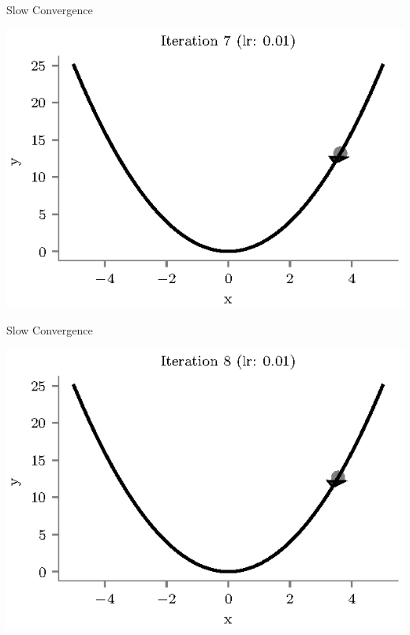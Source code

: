 \documentclass{beamer}
\begin{document}
\begin{frame}{Slow Convergence}
\begin{center}
\includegraphics[totalheight=6cm]{gradient-descent/undershooting-7.eps}
\end{center}
\end{frame}

\begin{frame}{Slow Convergence}
\begin{center}
\includegraphics[totalheight=6cm]{gradient-descent/undershooting-8.eps}
\end{center}
\end{frame}
\end{document}
